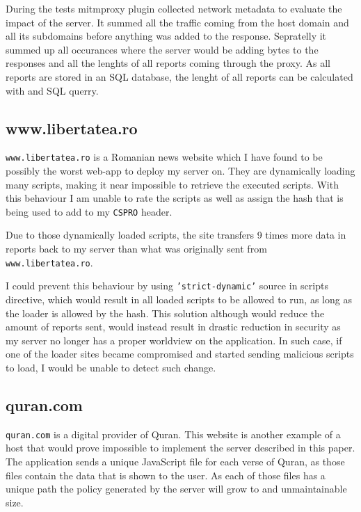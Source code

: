 \begin{description}
During the tests mitmproxy plugin collected network metadata to evaluate the impact of the server.
It summed all the traffic coming from the host domain and all its subdomains before anything was added to the response.
Sepratelly it summed up all occurances where the server would be adding bytes to the responses and all the lenghts of all reports coming through the proxy.
As all reports are stored in an SQL database, the lenght of all reports can be calculated with and SQL querry.

\subsection{www.libertatea.ro}

\texttt{www.libertatea.ro} is a Romanian news website which I have found to be possibly the worst web-app to deploy my server on.
They are dynamically loading many scripts, making it near impossible to retrieve the executed scripts.
With this behaviour I am unable to rate the scripts as well as assign the hash that is being used to add to my \texttt{CSPRO} header.

Due to those dynamically loaded scripts, the site transfers 9 times more data in reports back to my server than what was originally sent from \texttt{www.libertatea.ro}.

I could prevent this behaviour by using \texttt{'strict-dynamic'} source in scripts directive, which would result in all loaded scripts to be allowed to run, as long as the loader is allowed by the hash.
This solution although would reduce the amount of reports sent, would instead result in drastic reduction in security as my server no longer has a proper worldview on the application.
In such case, if one of the loader sites became compromised and started sending malicious scripts to load, I would be unable to detect such change.

\subsection{quran.com}

\texttt{quran.com} is a digital provider of Quran. 
This website is another example of a host that would prove impossible to implement the server described in this paper.
The application sends a unique JavaScript file for each verse of Quran, as those files contain the data that is shown to the user.
As each of those files has a unique path the policy generated by the server will grow to and unmaintainable size.


\end{description}
